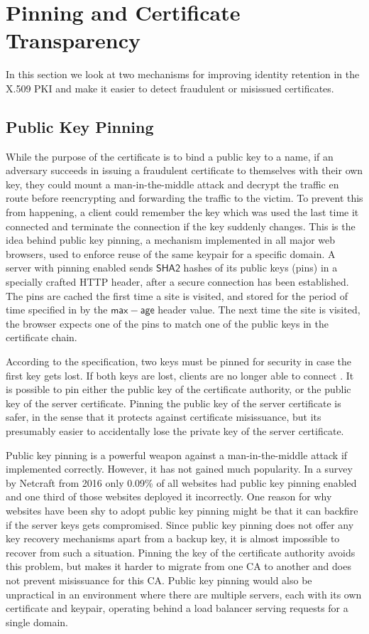 \documentclass{style/kththesis}
\begin{document}
\section{Pinning and Certificate Transparency}
In this section we look at two mechanisms for improving identity retention in the X.509 PKI and make it easier to detect fraudulent or misissued certificates.

\subsection{Public Key Pinning}
While the purpose of the certificate is to bind a public key to a name, if an adversary succeeds in issuing a fraudulent certificate to themselves with their own key, they could mount a man-in-the-middle attack and decrypt the traffic en route before reencrypting and forwarding the traffic to the victim. To prevent this from happening, a client could remember the key which was used the last time it connected and terminate the connection if the key suddenly changes. This is the idea behind public key pinning, a mechanism implemented in all major web browsers, used to enforce reuse of the same keypair for a specific domain. A server with pinning enabled sends $\mathsf{SHA2}$ hashes of its public keys (pins) in a specially crafted HTTP header, after a secure connection has been established. The pins are cached the first time a site is visited, and stored for the period of time specified in by the $\mathsf{max-age}$ header value. The next time the site is visited, the browser expects one of the pins to match one of the public keys in the certificate chain.

According to the specification, two keys must be pinned for security in case the first key gets lost. If both keys are lost, clients are no longer able to connect \cite{RFC7469}. It is possible to pin either the public key of the certificate authority, or the public key of the server certificate. Pinning the public key of the server certificate is safer, in the sense that it protects against certificate misissuance, but its presumably easier to accidentally lose the private key of the server certificate.

Public key pinning is a powerful weapon against a man-in-the-middle attack if implemented correctly. However, it has not gained much popularity. In a survey by Netcraft from 2016 \cite{Netcraft16} only 0.09\% of all websites had public key pinning enabled and one third of those websites deployed it incorrectly. One reason for why websites have been shy to adopt public key pinning might be that it can backfire if the server keys gets compromised. Since public key pinning does not offer any key recovery mechanisms apart from a backup key, it is almost impossible to recover from such a situation. Pinning the key of the certificate authority avoids this problem, but makes it harder to migrate from one CA to another and does not prevent misissuance for this CA. Public key pinning would also be unpractical in an environment where there are multiple servers, each with its own certificate and keypair, operating behind a load balancer serving requests for a single domain.
\end{document}
